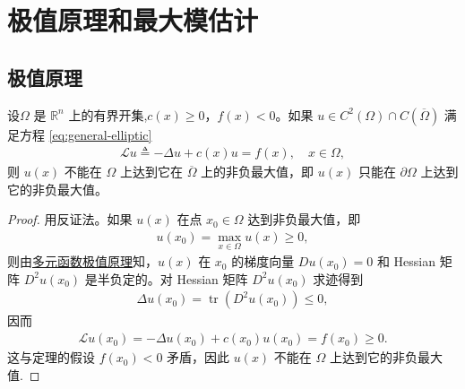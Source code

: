 \documentclass[../../main.tex]{subfiles}%
\begin{document}
\section{极值原理和最大模估计}

\subsection{极值原理}

\begin{theorem}\label{theorem:PDE-极值原理1}
设$\Omega$ 是 $\mathbb{R}^n$ 上的有界开集,$c(x)\geqslant 0$，$f(x)<0$。如果 $u\in C^2(\Omega)\cap C(\overline{\Omega})$ 满足方程 \eqref{eq:general-elliptic}
\begin{align}
\mathcal{L}u \triangleq -\Delta u + c(x)u = f(x), \quad x\in\Omega,\label{eq:general-elliptic}
\end{align}
则 $u(x)$ 不能在 $\Omega$ 上达到它在 $\overline{\Omega}$ 上的非负最大值，即 $u(x)$ 只能在 $\partial\Omega$ 上达到它的非负最大值。
\end{theorem}
\begin{proof}
用反证法。如果 $u(x)$ 在点 $x_0\in\Omega$ 达到非负最大值，即
\begin{align*}
u(x_0) = \max_{x\in\Omega} u(x) \geqslant 0,
\end{align*}
则由\hyperref[Basis of Analytics-theorem:多元函数极值原理]{多元函数极值原理}知，$u(x)$ 在 $x_0$ 的梯度向量 $Du(x_0)=0$ 和 Hessian 矩阵 $D^2u(x_0)$ 是半负定的。对 Hessian 矩阵 $D^2u(x_0)$ 求迹得到
\begin{align*}
\Delta u(x_0) = \operatorname{tr}(D^2u(x_0)) \leqslant 0,
\end{align*}
因而
\begin{align*}
\mathcal{L}u(x_0) = -\Delta u(x_0) + c(x_0)u(x_0) = f(x_0) \geqslant 0.
\end{align*}
这与定理的假设 $f(x_0)<0$ 矛盾，因此 $u(x)$ 不能在 $\Omega$ 上达到它的非负最大值.
\end{proof}
\end{document}
